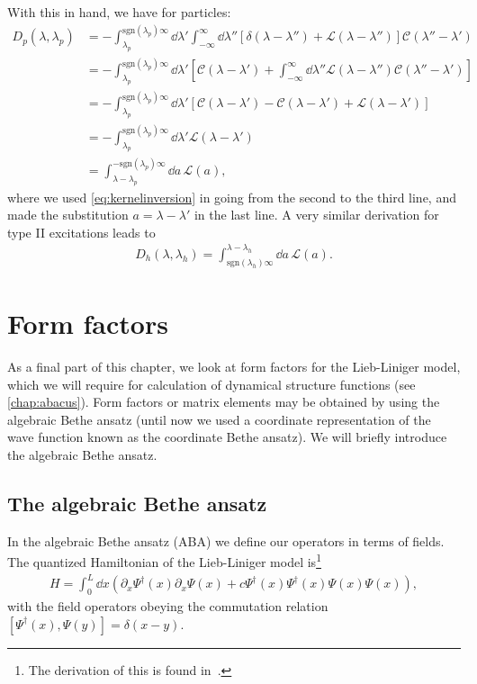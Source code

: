 \documentclass[11pt, a4paper]{report} %
\begin{document}
With this in hand, we have for particles:
\begin{align}
	D_p(\lambda, \lambda_p) &= - \int_{\lambda_p}^{\textrm{sgn}(\lambda_p)\infty} \dd \lambda' \int_{-\infty}^{\infty} \dd  \lambda'' \left[\delta(\lambda-\lambda'') + \mathcal{L}(\lambda-\lambda'') \right]\mathcal{C}(\lambda''-\lambda')\\
	&= - \int_{\lambda_p}^{\textrm{sgn}(\lambda_p)\infty} \dd \lambda' \left[\mathcal{C}(\lambda-\lambda') + \int_{-\infty}^{\infty} \dd  \lambda'' \mathcal{L}(\lambda-\lambda'') \mathcal{C}(\lambda''-\lambda')\right]\\
	&= - \int_{\lambda_p}^{\textrm{sgn}(\lambda_p)\infty} \dd \lambda' \left[\mathcal{C}(\lambda-\lambda') - \mathcal{C}(\lambda-\lambda') + \mathcal{L}(\lambda-\lambda')\right]\\
	&= - \int_{\lambda_p}^{\textrm{sgn}(\lambda_p)\infty} \dd \lambda' \mathcal{L}(\lambda-\lambda')\\
	&=  \int_{\lambda-\lambda_p}^{-\textrm{sgn}(\lambda_p)\infty} \dd a \, \mathcal{L}(a),
\end{align}
where we used \cref{eq:kernelinversion} in going from the second to the third line, and made the substitution \(a = \lambda-\lambda'\) in the last line.
A very similar derivation for type II excitations leads to
\begin{align}
	D_h(\lambda,\lambda_h) = \int_{\textrm{sgn}(\lambda_h)\infty}^{\lambda-\lambda_h} \dd a\, \mathcal{L}(a).
\end{align}


\section{Form factors}
As a final part of this chapter, we look at form factors for the Lieb-Liniger model, which we will require for calculation of dynamical structure functions (see \cref{chap:abacus}).
Form factors or matrix elements may be obtained by using the algebraic Bethe ansatz (until now we used a coordinate representation of the wave function known as the coordinate Bethe ansatz).
We will briefly introduce the algebraic Bethe ansatz. 

\subsection{The algebraic Bethe ansatz}

In the algebraic Bethe ansatz (ABA) we define our operators in terms of fields.
The quantized Hamiltonian of the Lieb-Liniger model is\footnote{The derivation of this is found in~\cite{feynman}.}
\begin{align}
  \label{eq:30}
  H = \int_0^L \dd x \left(\partial_x \Psi^{\dag}(x) \partial_x \Psi(x) + c \Psi^{\dag}(x)\Psi^{\dag}(x)\Psi(x)\Psi(x)\right),
\end{align}
with the field operators obeying the commutation relation \([\Psi^{\dag}(x),\Psi(y)] = \delta(x-y)\).
\end{document}
